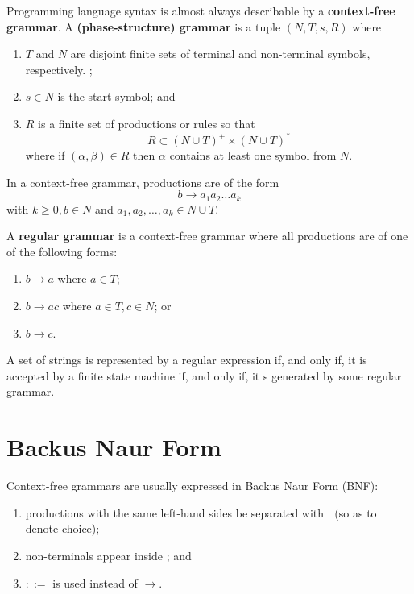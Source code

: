 \begin{definition}
    Programming language syntax is almost always describable by a \textbf{context-free grammar}. A \textbf{(phase-structure) grammar} is a tuple $(N,T,s,R)$ where
    \begin{enumerate}
        \item $T$ and $N$ are disjoint finite sets of terminal and non-terminal symbols, respectively.
        ;
        \item $s\in N$ is the start symbol; and
        \item $R$ is a finite set of productions or rules so that
        \[R\subset(N\cup T)^+\times(N\cup T)^*\]
        where if $(\alpha,\beta)\in R$ then $\alpha$ contains at least one symbol from $N$.
    \end{enumerate}
    In a context-free grammar, productions are of the form
    \[b\rightarrow a_1a_2\ldots a_k\]
    with $k\geq0,b\in N$ and $a_1,a_2,\ldots,a_k\in N\cup T$.
\end{definition}

\begin{definition}
    A \textbf{regular grammar} is a context-free grammar where all productions are of one of the following forms:
    \begin{enumerate}
        \item $b\rightarrow a$ where $a\in T$;
        \item $b\rightarrow ac$ where $a\in T,c\in N$; or
        \item $b\rightarrow c$.
    \end{enumerate}
\end{definition}

\begin{theorem}
    A set of strings is represented by a regular expression if, and only if, it is accepted by a finite state machine if, and only if, it s generated by some regular grammar.
\end{theorem}


\section{Backus Naur Form}

\begin{definition}
    Context-free grammars are usually expressed in Backus Naur Form (BNF):
    
    \begin{enumerate}
        \item productions with the same left-hand sides be separated with $|$ (so as to denote choice);
        \item non-terminals appear inside ; and
        \item $::=$ is used instead of $\rightarrow$.
    \end{enumerate}
\end{definition}
